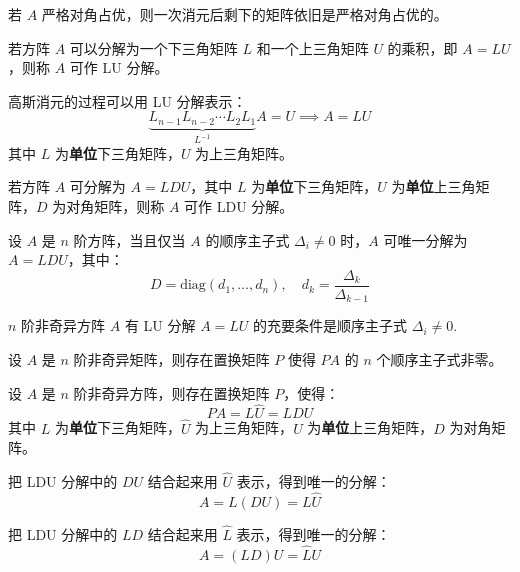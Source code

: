 \begin{theorem}
若 $A$ 严格对角占优，则一次消元后剩下的矩阵依旧是严格对角占优的。
\end{theorem}

\begin{definition}[LU 分解]
若方阵 $A$ 可以分解为一个下三角矩阵 $L$ 和一个上三角矩阵 $U$ 的乘积，即 $A=LU$，则称 $A$ 可作 LU 分解。
\end{definition}

\begin{com}
高斯消元的过程可以用 LU 分解表示：
\[
    \underbrace{L_{n-1}L_{n-2}\cdots L_2L_1}_{L^{-1}} A=U\implies A=LU
\]
其中 $L$ 为\textbf{单位}下三角矩阵，$U$ 为上三角矩阵。
\end{com}

\begin{definition}[LDU 分解]
若方阵 $A$ 可分解为 $A=LDU$，其中 $L$ 为\textbf{单位}下三角矩阵，$U$ 为\textbf{单位}上三角矩阵，$D$ 为对角矩阵，则称 $A$ 可作 LDU 分解。
\end{definition}

\begin{theorem}
设 $A$ 是 $n$ 阶方阵，当且仅当 $A$ 的顺序主子式 $\Delta_i\neq 0$ 时，$A$ 可唯一分解为 $A=LDU$，其中：
\[
    D=\text{diag}(d_1,\ldots,d_n),\quad d_k=\frac{\Delta_k}{\Delta_{k-1}}
\]
\end{theorem}

\begin{corollary}
$n$ 阶非奇异方阵 $A$ 有 LU 分解 $A=LU$ 的充要条件是顺序主子式 $\Delta_i\neq 0$.
\end{corollary}

\begin{theorem}
设 $A$ 是 $n$ 阶非奇异矩阵，则存在置换矩阵 $P$ 使得 $PA$ 的 $n$ 个顺序主子式非零。
\end{theorem}

\begin{corollary}[带有置换矩阵的三角分解]
设 $A$ 是 $n$ 阶非奇异方阵，则存在置换矩阵 $P$，使得：
\[
    PA=L\hat U=LDU
\]
其中 $L$ 为\textbf{单位}下三角矩阵，$\hat U$ 为上三角矩阵，$U$ 为\textbf{单位}上三角矩阵，$D$ 为对角矩阵。
\end{corollary}


\begin{definition}[Doolittle 分解]
把 LDU 分解中的 $DU$ 结合起来用 $\hat U$ 表示，得到唯一的分解：
\[
    A=L(DU)=L\hat U
\]
\end{definition}
\begin{definition}[Crout 分解]
把 LDU 分解中的 $LD$ 结合起来用 $\hat L$ 表示，得到唯一的分解：
\[
    A=(LD)U=\hat LU
\]
\end{definition}


